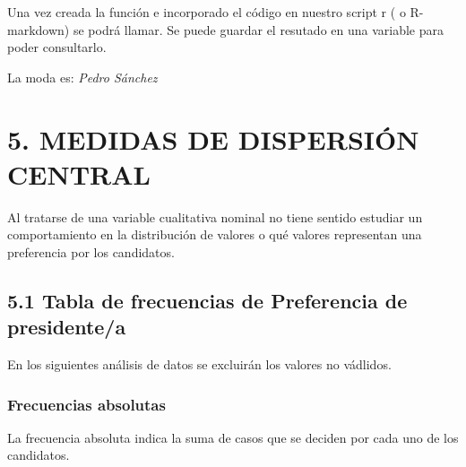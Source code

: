 \documentclass[
]{article}
\newenvironment{Shaded}{\begin{snugshade}}{\end{snugshade}}
\newcommand{\AttributeTok}[1]{\textcolor[rgb]{0.13,0.29,0.53}{#1}}
\newcommand{\FunctionTok}[1]{\textcolor[rgb]{0.13,0.29,0.53}{\textbf{#1}}}
\newcommand{\NormalTok}[1]{#1}
\newcommand{\OtherTok}[1]{\textcolor[rgb]{0.56,0.35,0.01}{#1}}
\newcommand{\SpecialCharTok}[1]{\textcolor[rgb]{0.81,0.36,0.00}{\textbf{#1}}}
\newcommand{\StringTok}[1]{\textcolor[rgb]{0.31,0.60,0.02}{#1}}
\begin{document}
Una vez creada la función e incorporado el código en nuestro script r (
o R-markdown) se podrá llamar. Se puede guardar el resutado en una
variable para poder consultarlo.

\begin{Shaded}
\end{Shaded}

La moda es: \emph{Pedro Sánchez} \newpage

\hypertarget{medidas-de-dispersiuxf3n-central}{%
\section{5. MEDIDAS DE DISPERSIÓN
CENTRAL}\label{medidas-de-dispersiuxf3n-central}}

Al tratarse de una variable cualitativa nominal no tiene sentido
estudiar un comportamiento en la distribución de valores o qué valores
representan una preferencia por los candidatos.

\hypertarget{tabla-de-frecuencias-de-preferencia-de-presidentea}{%
\subsection{5.1 Tabla de frecuencias de Preferencia de
presidente/a}\label{tabla-de-frecuencias-de-preferencia-de-presidentea}}

En los siguientes análisis de datos se excluirán los valores no
vádlidos.

\hypertarget{frecuencias-absolutas}{%
\subsubsection{Frecuencias absolutas}\label{frecuencias-absolutas}}

La frecuencia absoluta indica la suma de casos que se deciden por cada
uno de los candidatos.

\begin{Shaded}
\end{Shaded}
\end{document}
